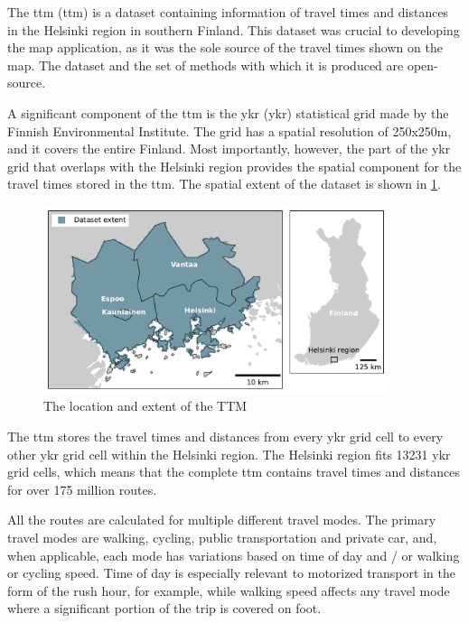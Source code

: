The \acrlong{ttm} (\acrshort{ttm}) \parencite{fin2023}
is a dataset containing information of travel times and distances
in the Helsinki region in southern Finland.
This dataset was crucial to developing the map application,
as it was the sole source of the travel times shown on the map.
The dataset and the set of methods with which it is produced are open-source.

A significant component of the \acrshort{ttm} is the \acrlong{ykr} (\acrshort{ykr})
statistical grid made by the Finnish Environmental Institute.
The grid has a spatial resolution of 250x250m, and it covers the entire Finland.
Most importantly, however, the part of the \acrshort{ykr} grid that overlaps with
the Helsinki region provides the spatial component for
the travel times stored in the \acrshort{ttm}.
The spatial extent of the dataset is shown in \ref{fig:ttm extent}.

\begin{figure}[H]
	\centering
	\includegraphics[width=0.9\textwidth]{visual/figures/ttm/ttm_extent.pdf}
	\caption{The location and extent of the TTM}
	\label{fig:ttm extent}
\end{figure}

The \acrshort{ttm} stores the travel times and distances
from every \acrshort{ykr} grid cell to every other  \acrshort{ykr} grid cell
within the Helsinki region.
The Helsinki region fits 13231 \acrshort{ykr} grid cells,
which means that the complete \acrshort{ttm} contains travel times and distances for
over 175 million routes.

All the routes are calculated for multiple different travel modes.
The primary travel modes are walking, cycling, public transportation and private car,
and, when applicable, each mode has variations based on
time of day and / or walking or cycling speed.
Time of day is especially relevant to motorized transport
in the form of the rush hour, for example,
while walking speed affects any travel mode
where a significant portion of the trip is covered on foot.

